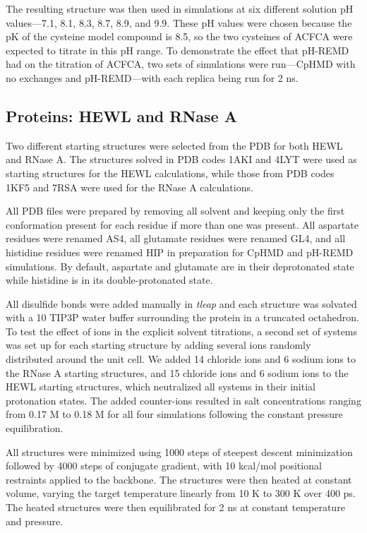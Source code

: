 The resulting structure was then used in simulations at six different solution
pH values---7.1, 8.1, 8.3, 8.7, 8.9, and 9.9. These pH values were chosen
because the pK of the cysteine model compound is 8.5, so the two
cysteines of ACFCA were expected to titrate in this pH range.  To demonstrate
the effect that pH-REMD had on the titration of ACFCA, two sets of simulations
were run---CpHMD with no exchanges and pH-REMD---with each replica being run for
2 ns.

\subsection{Proteins: HEWL and RNase A}

Two different starting structures were selected from the PDB for both HEWL and
RNase A. The structures solved in PDB codes 1AKI
\cite{Artymiuk_ActaCrystB_1982_v38_p778} and 4LYT
\cite{Young_JApplCryst_1993_v26_p309} were used as starting structures for the
HEWL calculations, while those from PDB codes 1KF5
\cite{Berisio_ActaCrystallogrD_2002_v58_p441} and 7RSA
\cite{Wlodawer_Biochemistry_1988_v27_p2705} were used for the RNase A
calculations.

All PDB files were prepared by removing all solvent and keeping only the first
conformation present for each residue if more than one was present. All
aspartate residues were renamed AS4, all glutamate residues were renamed GL4,
and all histidine residues were renamed HIP in preparation for CpHMD and pH-REMD
simulations. By default, aspartate and glutamate are in their deprotonated state
while histidine is in its double-protonated state.

All disulfide bonds were added manually in \emph{tleap} and each structure was
solvated with a 10 \text{\AA} TIP3P water buffer surrounding the protein in a
truncated octahedron. To test the effect of ions in the explicit solvent
titrations, a second set of systems was set up for each starting structure by
adding several ions randomly distributed around the unit cell. We added 14
chloride ions and 6 sodium ions to the RNase A starting structures, and 15
chloride ions and 6 sodium ions to the HEWL starting structures, which
neutralized all systems in their initial protonation states.  The added
counter-ions resulted in salt concentrations ranging from 0.17 M to 0.18 M for
all four simulations following the constant pressure equilibration.

All structures were minimized using 1000 steps of steepest descent minimization
followed by 4000 steps of conjugate gradient, with 10 kcal/mol positional
restraints applied to the backbone. The structures were then heated at constant
volume, varying the target temperature linearly from 10 K to 300 K over 400 ps.
The heated structures were then equilibrated for 2 ns at constant temperature
and pressure.

